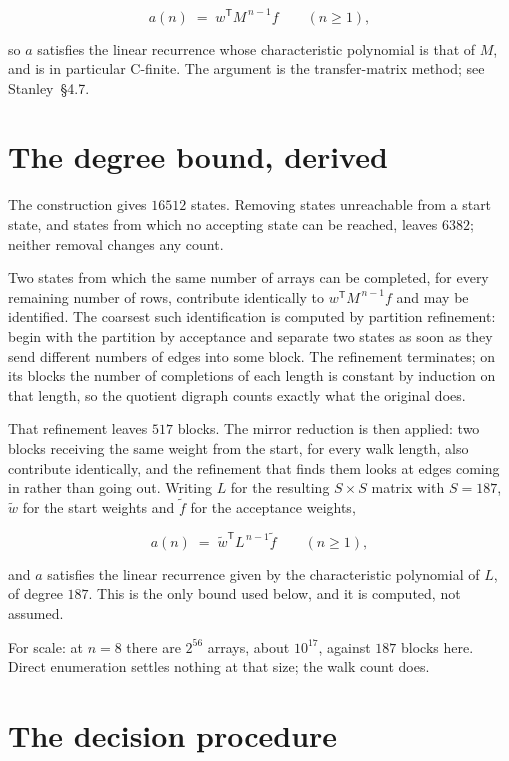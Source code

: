 \documentclass[11pt]{article}
\theoremstyle{definition}
\begin{document}
\[a(n) \;=\; w^{\mathsf T} M^{\,n-1} f \qquad (n \ge 1),\]

so $a$ satisfies the linear recurrence whose characteristic polynomial is that of $M$, and is in particular C-finite. The argument is the transfer-matrix method; see Stanley~\S4.7.

\section{The degree bound, derived}

The construction gives $16512$ states. Removing states unreachable from a start state, and states from which no accepting state can be reached, leaves $6382$; neither removal changes any count.

Two states from which the same number of arrays can be completed, for every remaining number of rows, contribute identically to $w^{\mathsf T}M^{\,n-1}f$ and may be identified. The coarsest such identification is computed by partition refinement: begin with the partition by acceptance and separate two states as soon as they send different numbers of edges into some block. The refinement terminates; on its blocks the number of completions of each length is constant by induction on that length, so the quotient digraph counts exactly what the original does.

That refinement leaves $517$ blocks. The mirror reduction is then applied: two blocks receiving the same weight from the start, for every walk length, also contribute identically, and the refinement that finds them looks at edges coming in rather than going out. Writing $L$ for the resulting $S \times S$ matrix with $S = 187$, $\tilde w$ for the start weights and $\tilde f$ for the acceptance weights,

\[a(n) \;=\; \tilde w^{\mathsf T} L^{\,n-1} \tilde f \qquad (n \ge 1),\]

and $a$ satisfies the linear recurrence given by the characteristic polynomial of $L$, of degree $187$. This is the only bound used below, and it is computed, not assumed.

For scale: at $n = 8$ there are $2^{56}$ arrays, about $10^{17}$, against $187$ blocks here. Direct enumeration settles nothing at that size; the walk count does.

\section{The decision procedure}
\end{document}
